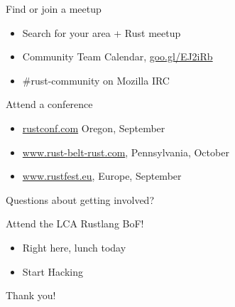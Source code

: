 \documentclass[aspectratio=169]{beamer}
\begin{document}
\begin{frame}
    Find or join a meetup
    \begin{itemize}
        \item Search for your area + Rust meetup
        \item Community Team Calendar, \url{goo.gl/EJ2iRb}
        \item \#rust-community on Mozilla IRC
    \end{itemize}
\end{frame}

\begin{frame}
    Attend a conference
    \begin{itemize}
        \item \url{rustconf.com} Oregon, September
        \item \url{www.rust-belt-rust.com}, Pennsylvania, October
        \item \url{www.rustfest.eu}, Europe, September
    \end{itemize}
\end{frame}

\begin{frame}
    \hfill Questions about getting involved?
\end{frame}

\begin{frame}
    Attend the LCA Rustlang BoF!
    \begin{itemize}
        \item Right here, lunch today
        \item Start Hacking
    \end{itemize}
\end{frame}

\begin{frame}

Thank you!

\end{frame}
%
%
\end{document}

